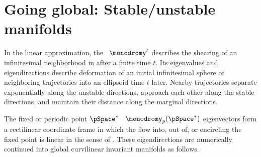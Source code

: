 

\section{Going global: Stable/unstable manifolds}
\label{s-StabUnstManif}




In the linear approximation,
the \jacobianM\ $\monodromy^{t}$
describes the shearing of an infinitesimal neighborhood in
after a finite time $t$.
Its eigenvalues and eigendirections
describe deformation of an initial infinitesimal sphere of neighboring
trajectories into an ellipsoid time $t$ later.
Nearby trajectories
separate exponentially along the {unstable directions},
approach each other along the {stable directions},
and maintain their distance along the {marginal directions}.

The fixed or periodic point $\pSpace^{*}$
\jacobianM\ $\monodromy_p(\pSpace^{*})$
eigenvectors  form a rectilinear
coordinate frame in which the flow into, out of, or encircling the
fixed point is linear in the sense of .
These eigendirections are numerically continued into global curvilinear
invariant manifolds as follows.


